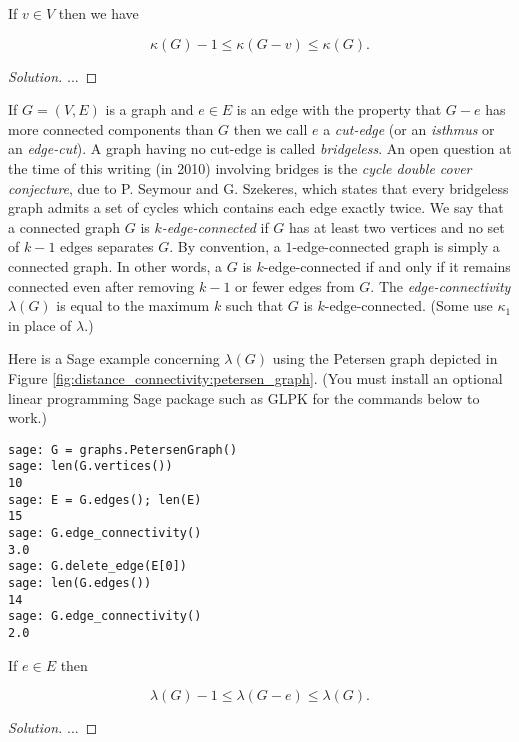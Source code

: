 \begin{lemma}
{\rm
If $v\in V$ then we have

\[
\kappa(G)-1\leq \kappa(G-v)\leq \kappa(G).
\]
}
\end{lemma}

\begin{proof}[Solution]

...
\end{proof}


If $G=(V,E)$ is a graph and $e\in E$ is an edge with the property
that $G-e$ has more connected components than $G$ then
we call $e$ a {\it cut-edge} (or an {\it isthmus} or an {\it edge-cut}).
A graph having no cut-edge is called {\it bridgeless}.
An open question at the time of this writing
(in 2010) involving bridges is the
{\it cycle double cover conjecture}, due to P. Seymour and G. Szekeres,
which states that every bridgeless graph admits a set
of cycles which contains each edge exactly twice.
We say that a connected graph $G$ is {\it $k$-edge-connected}
if
$G$ has at least two vertices and no set of $k-1$ edges separates $G$.
By convention, a $1$-edge-connected graph is simply a connected
graph. In other words, a $G$ is $k$-edge-connected if and only if
it remains connected even after removing $k-1$ or fewer edges
from $G$. The {\it edge-connectivity}
$\lambda(G)$ is equal to the maximum $k$ such that
$G$ is $k$-edge-connected. (Some use
$\kappa_1$ in place of $\lambda$.)

Here is a Sage example concerning
$\lambda(G)$ using the Petersen graph
depicted in Figure \ref{fig:distance_connectivity:petersen_graph}.
(You must install an optional linear programming
Sage package such as GLPK for the commands below to work.)

\begin{lstlisting}
sage: G = graphs.PetersenGraph()
sage: len(G.vertices())
10
sage: E = G.edges(); len(E)
15
sage: G.edge_connectivity()
3.0
sage: G.delete_edge(E[0])
sage: len(G.edges())
14
sage: G.edge_connectivity()
2.0
\end{lstlisting}

\begin{lemma}
{\rm
If $e\in E$ then

\[
\lambda(G)-1\leq \lambda(G-e)\leq \lambda(G).
\]
}
\end{lemma}

\begin{proof}[Solution]

...

\end{proof}

